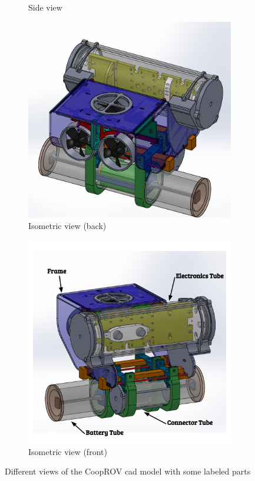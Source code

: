 \documentclass {udthesis}
\begin{document}
\begin{figure}
\begin{subfigure}[]{0.33\textwidth}
        \caption{Side view}
        \label{fig:cooprov_sideview}
    \end{subfigure}%
    \begin{subfigure}[]{0.33\textwidth}
        \centering
        \includegraphics[width=0.95\linewidth]{cooprov_isobackview}
        \caption{Isometric view (back)}
        \label{cooprov_isobackview}
    \end{subfigure}
    \begin{subfigure}[]{0.7\textwidth}
        \centering
        \includegraphics[width=0.95\linewidth]{cooprov_labels}
        \caption{Isometric view (front)}
        \label{cooprov_labels}
    \end{subfigure}
    \caption[CoopROV CAD model]{Different views of the CoopROV \gls{cad} model with some labeled parts}
    \label{fig:cooprov_cad}
\end{figure}
\end{document}
